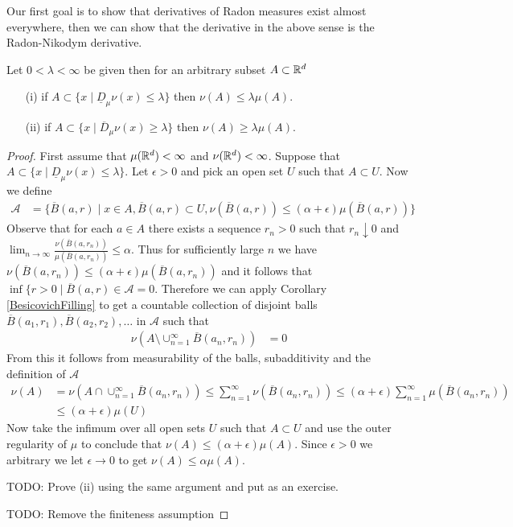 Our first goal is to show that derivatives of Radon measures exist almost everywhere, then we can show that the derivative in the above sense 
is the Radon-Nikodym derivative.

\begin{lem}\label{RadonDerivativeBounds}Let $0 < \lambda < \infty$ be given then for an arbitrary subset $A \subset \mathbb{R}^d$
\begin{itemize}
\item[(i)] if $A \subset \lbrace x \mid \underline{D}_\mu \nu(x) \leq \lambda \rbrace$ then $\nu(A) \leq \lambda \mu(A)$. 
\item[(ii)] if $A \subset \lbrace x \mid \overline{D}_\mu \nu(x) \geq \lambda \rbrace$ then $\nu(A) \geq \lambda \mu(A)$. 
\end{itemize}
\end{lem}
\begin{proof}
First assume that $\mu(\mathbb{R}^d) < \infty$ and $\nu(\mathbb{R}^d) < \infty$.  Suppose that $A \subset \lbrace x \mid \underline{D}_\mu \nu(x) \leq \lambda \rbrace$.
Let $\epsilon > 0$ and pick an open set $U$ such that $A \subset U$.  Now we define
\begin{align*}
\mathcal{A} &= \lbrace \overline{B}(a, r) \mid x \in A, \overline{B}(a,r) \subset U, \nu(\overline{B}(a, r)) \leq (\alpha  + \epsilon) \mu(\overline{B}(a, r)) \rbrace
\end{align*}
Observe that for each $a \in A$ there exists a sequence $r_n>0$ such that $r_n \downarrow 0$ and $\lim_{n \to \infty} \frac{\nu(\overline{B}(a, r_n))}{\mu(\overline{B}(a,r_n))} \leq \alpha$.  Thus for sufficiently large $n$ we have $\nu(\overline{B}(a, r_n)) \leq (\alpha + \epsilon) \mu(\overline{B}(a,r_n))$ and it follows that $\inf \lbrace r>0 \mid \overline{B}(a,r) \in \mathcal{A} = 0$.  Therefore we can apply Corollary \ref{BesicovichFilling} to
get a countable collection of disjoint balls $\overline{B}(a_1, r_1), \overline{B}(a_2, r_2), \dotsc$ in $\mathcal{A}$ such that 
\begin{align*}
\nu \left(A \setminus \cup_{n=1}^\infty \overline{B}(a_n, r_n) \right) &= 0
\end{align*}
From this it follows from measurability of the balls, subadditivity and the definition of $\mathcal{A}$
\begin{align*}
\nu(A) 
&= \nu(A \cap \cup_{n=1}^\infty \overline{B}(a_n, r_n) ) 
\leq \sum_{n=1}^\infty \nu(\overline{B}(a_n, r_n) ) 
\leq (\alpha + \epsilon) \sum_{n=1}^\infty \mu(\overline{B}(a_n, r_n) ) \\
&\leq  (\alpha + \epsilon) \mu(U)
\end{align*}
Now take the infimum over all open sets $U$ such that $A \subset U$ and use the outer regularity of $\mu$ to conclude that $\nu(A) \leq (\alpha + \epsilon) \mu(A)$.  Since $\epsilon>0$ we 
arbitrary we let $\epsilon \to 0$ to get $\nu(A) \leq \alpha \mu(A)$.

TODO: Prove (ii) using the same argument and put as an exercise.

TODO: Remove the finiteness assumption
\end{proof}

